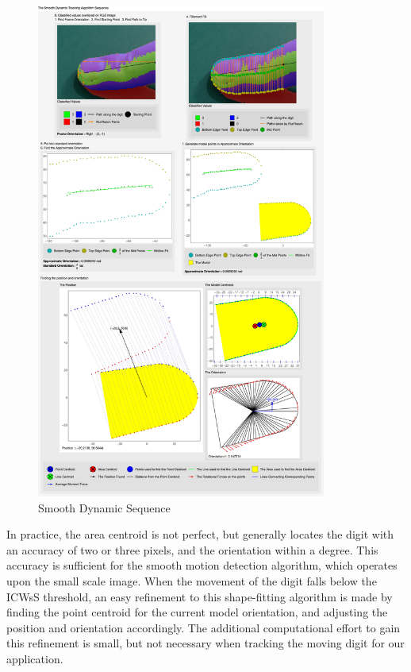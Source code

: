 \begin{figure}[h!]
  \centering
    \includegraphics[width=0.85\textwidth]{Chapter4/Figs/Smooth_Dynamic_Sequence.jpg}
    \caption{Smooth Dynamic Sequence}\label{fig:SmoothDynamicSequence}
\end{figure}

In practice, the area centroid is not perfect, but generally locates the digit with an accuracy of two or three pixels, and the orientation within a degree. This accuracy is sufficient for the smooth motion detection algorithm, which operates upon the small scale image. When the movement of the digit falls below the ICWsS threshold, an easy refinement to this shape-fitting algorithm is made by finding the point centroid for the current model orientation, and adjusting the position and orientation accordingly. The additional computational effort to gain this refinement is small, but not necessary when tracking the moving digit for our application.
\clearpage
